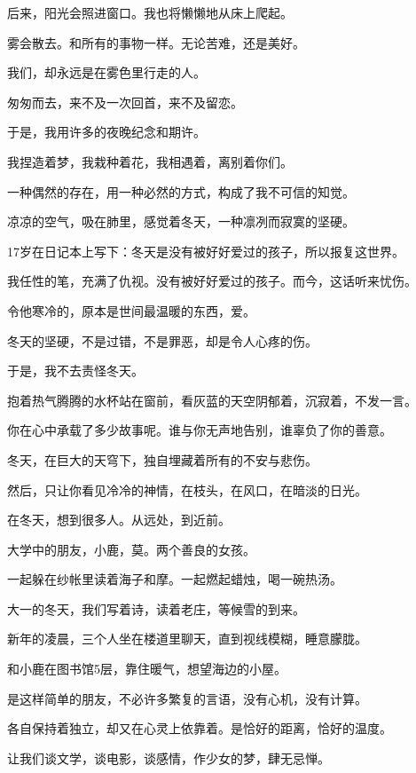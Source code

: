 \documentclass[12pt,a4paper]{article}
\begin{document}
		后来，阳光会照进窗口。我也将懒懒地从床上爬起。\par
		雾会散去。和所有的事物一样。无论苦难，还是美好。\par
		我们，却永远是在雾色里行走的人。\par
		匆匆而去，来不及一次回首，来不及留恋。\par
		于是，我用许多的夜晚纪念和期许。\par
		我捏造着梦，我栽种着花，我相遇着，离别着你们。

	\endwriting



		一种偶然的存在，用一种必然的方式，构成了我不可信的知觉。\par
		凉凉的空气，吸在肺里，感觉着冬天，一种凛冽而寂寞的坚硬。\par
		17岁在日记本上写下：冬天是没有被好好爱过的孩子，所以报复这世界。\par
		我任性的笔，充满了仇视。没有被好好爱过的孩子。而今，这话听来忧伤。\par
		令他寒冷的，原本是世间最温暖的东西，爱。\par
		冬天的坚硬，不是过错，不是罪恶，却是令人心疼的伤。\par
		于是，我不去责怪冬天。\par
		抱着热气腾腾的水杯站在窗前，看灰蓝的天空阴郁着，沉寂着，不发一言。\par
		你在心中承载了多少故事呢。谁与你无声地告别，谁辜负了你的善意。\par
		冬天，在巨大的天穹下，独自埋藏着所有的不安与悲伤。\par
		然后，只让你看见冷冷的神情，在枝头，在风口，在暗淡的日光。\par
		在冬天，想到很多人。从远处，到近前。\par
		大学中的朋友，小鹿，莫。两个善良的女孩。\par
		一起躲在纱帐里读着海子和摩。一起燃起蜡烛，喝一碗热汤。\par
		大一的冬天，我们写着诗，读着老庄，等候雪的到来。\par
		新年的凌晨，三个人坐在楼道里聊天，直到视线模糊，睡意朦胧。\par
		和小鹿在图书馆5层，靠住暖气，想望海边的小屋。\par
		是这样简单的朋友，不必许多繁复的言语，没有心机，没有计算。\par
		各自保持着独立，却又在心灵上依靠着。是恰好的距离，恰好的温度。\par
		让我们谈文学，谈电影，谈感情，作少女的梦，肆无忌惮。\par
\end{document}
